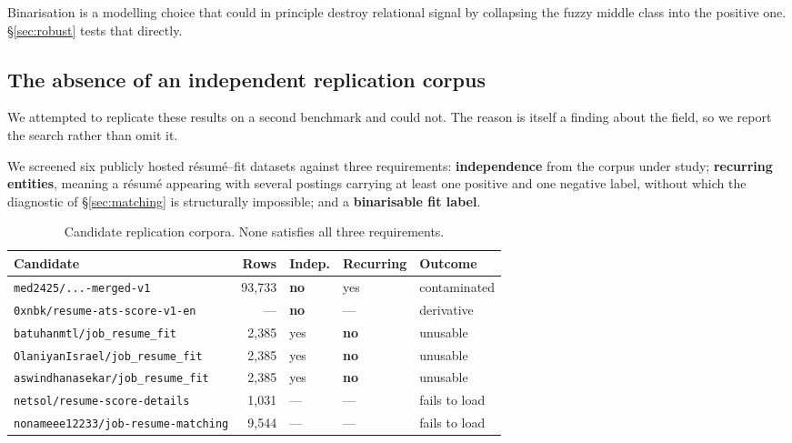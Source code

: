 \documentclass[11pt]{article}                      %
\newcommand{\tabfont}{\footnotesize}
\begin{document}
Binarisation is a modelling choice that could in principle destroy relational
signal by collapsing the fuzzy middle class into the positive one.
\S\ref{sec:robust} tests that directly.

\subsection{The absence of an independent replication corpus}
\label{sec:noreplication}

We attempted to replicate these results on a second benchmark and could not. The
reason is itself a finding about the field, so we report the search rather than
omit it.

We screened six publicly hosted résumé--fit datasets against three requirements:
\textbf{independence} from the corpus under study; \textbf{recurring entities},
meaning a résumé appearing with several postings carrying at least one positive
and one negative label, without which the diagnostic of \S\ref{sec:matching} is
structurally impossible; and a \textbf{binarisable fit label}.

\begin{table}[h]
\centering\tabfont
\caption{Candidate replication corpora. None satisfies all three requirements.}
\label{tab:candidates}
\begin{tabular}{lrlll}
\toprule
Candidate & Rows & Indep. & Recurring & Outcome \\
\midrule
\texttt{med2425/...-merged-v1} & 93{,}733 & \textbf{no} & yes & contaminated \\
\texttt{0xnbk/resume-ats-score-v1-en} & --- & \textbf{no} & --- & derivative \\
\texttt{batuhanmtl/job\_resume\_fit} & 2{,}385 & yes & \textbf{no} & unusable \\
\texttt{OlaniyanIsrael/job\_resume\_fit} & 2{,}385 & yes & \textbf{no} & unusable \\
\texttt{aswindhanasekar/job\_resume\_fit} & 2{,}385 & yes & \textbf{no} & unusable \\
\texttt{netsol/resume-score-details} & 1{,}031 & --- & --- & fails to load \\
\texttt{nonameee12233/job-resume-matching} & 9{,}544 & --- & --- & fails to load \\
\bottomrule
\end{tabular}
\end{table}
\end{document}
